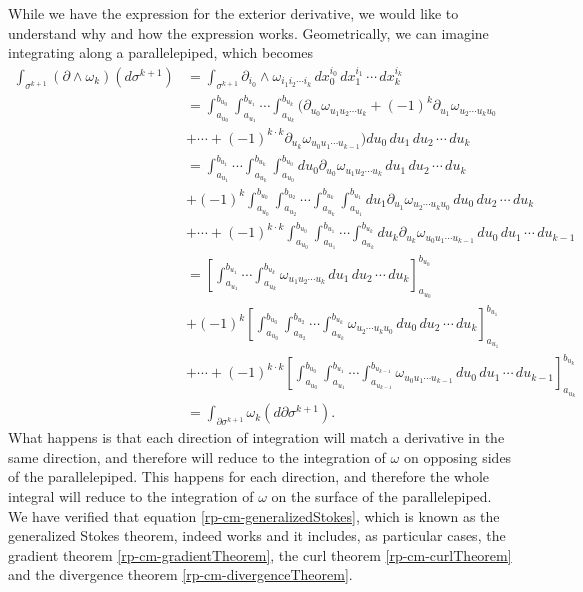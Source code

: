 While we have the expression for the exterior derivative, we would like to understand why and how the expression works. Geometrically, we can imagine integrating along a parallelepiped, which becomes
\begingroup
\allowdisplaybreaks
\begin{align*}
		\int_{\sigma^{k+1}} (\partial \wedge \omega_k) (d\sigma^{k+1}) &= \int_{\sigma^{k+1}} \partial_{i_0} \wedge \omega_{i_1 i_2 \cdots i_k} \, dx_0^{i_0} \, dx_1^{i_1} \, \cdots \, dx_k^{i_k} \\
		&= \int_{a_{u_0}}^{b_{u_0}} \int_{a_{u_1}}^{b_{u_1}} \cdots \int_{a_{u_k}}^{b_{u_k}} (\partial_{u_0} \omega_{u_1 u_2 \cdots u_k} + (-1)^{k} \partial_{u_1} \omega_{u_2 \cdots u_k u_0} \\
		&+ \cdots 
		+ (-1)^{k \cdot k} \partial_{u_k} \omega_{u_0 u_1 \cdots u_{k-1}} )du_0 \,du_1 \, du_2 \, \cdots \, du_k \\
		&= \int_{a_{u_1}}^{b_{u_1}} \cdots \int_{a_{u_k}}^{b_{u_k}} \int_{a_{u_0}}^{b_{u_0}} du_0 \partial_{u_0} \omega_{u_1 u_2 \cdots u_k} \,du_1 \, du_2 \, \cdots \, du_k \\
		&+ (-1)^{k} \int_{a_{u_0}}^{b_{u_0}} \int_{a_{u_2}}^{b_{u_2}} \cdots \int_{a_{u_k}}^{b_{u_k}} \int_{a_{u_1}}^{b_{u_1}} du_1 \partial_{u_1}  \omega_{u_2 \cdots u_k u_0} \,du_0 \, du_2 \, \cdots \, du_k \\
		&+ \cdots + (-1)^{k \cdot k} \int_{a_{u_0}}^{b_{u_0}} \int_{a_{u_1}}^{b_{u_1}} \cdots \int_{a_{u_{k}}}^{b_{u_k}} du_k  \partial_{u_k} \omega_{u_0 u_1 \cdots u_{k-1}} \,du_0 \, du_1 \, \cdots \, du_{k-1} \\
		&= \left[ \int_{a_{u_1}}^{b_{u_1}} \cdots \int_{a_{u_k}}^{b_{u_k}} \omega_{u_1 u_2 \cdots u_k} \,du_1 \, du_2 \, \cdots \, du_k \right]_{a_{u_0}}^{b_{u_0}} \\
		&+ (-1)^{k} \left[ \int_{a_{u_0}}^{b_{u_0}} \int_{a_{u_2}}^{b_{u_2}} \cdots \int_{a_{u_k}}^{b_{u_k}}\omega_{u_2 \cdots u_k u_0} \,du_0 \, du_2 \, \cdots \, du_k \right]_{a_{u_1}}^{b_{u_1}} \\
		&+ \cdots + (-1)^{k \cdot k} \left[ \int_{a_{u_0}}^{b_{u_0}} \int_{a_{u_1}}^{b_{u_1}} \cdots \int_{a_{u_{k-1}}}^{b_{u_{k-1}}} \omega_{u_0 u_1 \cdots u_{k-1}} \,du_0 \, du_1 \, \cdots \, du_{k-1} \right]_{a_{u_{k}}}^{b_{u_k}} \\
		&= \int_{\partial \sigma^{k+1}} \omega_k (d\partial\sigma^{k+1}).
\end{align*}
\endgroup
What happens is that each direction of integration will match a derivative in the same direction, and therefore will reduce to the integration of $\omega$ on opposing sides of the parallelepiped. This happens for each direction, and therefore the whole integral will reduce to the integration of $\omega$ on the surface of the parallelepiped. We have verified that equation \ref{rp-cm-generalizedStokes}, which is known as the generalized Stokes theorem, indeed works and it includes, as particular cases, the gradient theorem \ref{rp-cm-gradientTheorem}, the curl theorem \ref{rp-cm-curlTheorem} and the divergence theorem \ref{rp-cm-divergenceTheorem}.

